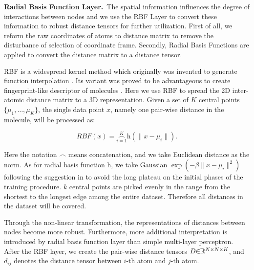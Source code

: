 \documentclass[letterpaper]{article} \usepackage{bm}
\begin{document}
\textbf{Radial Basis Function Layer.}\ The spatial information influences the degree of interactions between nodes and we use the RBF Layer to convert these information to robust distance tensors for further utilization. First of all, we reform the raw coordinates of atoms to distance matrix to remove the disturbance of selection of coordinate frame. Secondly, Radial Basis Functions are applied to convert the distance matrix to a distance tensor.

RBF is a widespread kernel method which originally was invented to generate function interpolation \cite{broomhead1988radial}. Its variant was proved to be advantageous to create fingerprint-like descriptor of molecules \cite{Li2018DeeperII}. Here we use RBF to spread the 2D inter-atomic distance matrix to a 3D representation. Given a set of $K$ central points $\{ \mu_1,\dots,\mu_K \}$, the single data point $x$, namely one pair-wise distance in the molecule, will be processed as:   

 \begin{equation} 
	\mathit{RBF}(x) = \mathop{\frown}\limits_{i=1}^{K}\mathrm{h}(\|x-\mu_i\|). 
\end{equation} 


\noindent Here the notation $\frown$ means concatenation, and we take Euclidean distance as the norm. As for radial basis function $\mathrm{h}$, we take Gaussian $\exp(-\beta\|x-\mu_i\|^2)$ following the suggestion in \cite{schutt2017schnet} to avoid the long plateau on the initial phases of the training procedure. $k$ central points are picked evenly in the range from the shortest to the longest edge among the entire dataset. Therefore all distances in the dataset will be covered. 

Through the non-linear transformation, the representations of distances between nodes become more robust. Furthermore, more additional interpretation is introduced by radial basis function layer than simple multi-layer perceptron. After the RBF layer, we create the pair-wise distance tensors $D \scriptsize{\in} \mathbb{R}^{N \scriptsize{\times}  N \scriptsize{\times}  K}$, and $d_{ij}$ denotes the distance tensor between $i$-th atom and $j$-th atom.
\end{document}
